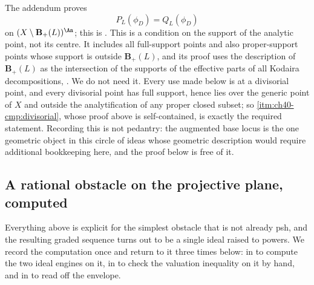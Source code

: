 \begin{remark}
\label{rem:ch40-off-base-locus}
The addendum proves
\[
                       P_L(\phi_D)=Q_L(\phi_D)
\tag{40.8}\label{eq:bj-smooth-off-base}
\]
on $(X\setminus\mathbf B_+(L))^{\An}$; this is
\cite[Lemma~1.5]{BJ22b}.  This is a condition on the support of the
analytic point, not its centre.  It includes all full-support points and
also proper-support points whose support is outside $\mathbf B_+(L)$, and its proof uses the description of
$\mathbf B_+(L)$ as the intersection of the supports of the effective
parts of all Kodaira decompositions, \cite{ELMNP05}.  We do not
need it.  Every use made below is at a divisorial point, and every
divisorial point has full support, hence lies over the generic point of
$X$ and outside the analytification of any proper closed subset; so
\cref{itm:ch40-cmp:divisorial}, whose proof above is self-contained, is
exactly the required statement.  Recording this is not pedantry: the
augmented base locus is the one geometric object in this circle of ideas
whose geometric description would require additional bookkeeping here, and the proof
below is free of it.
\end{remark}

\subsection{A rational obstacle on the projective plane, computed}
\label{sec:ch40-p2-example}

Everything above is explicit for the simplest obstacle that is not already
psh, and the resulting graded sequence turns out to be a single ideal raised
to powers.  We record the computation once and return to it three times
below: in  to compute the two ideal engines on it,
in  to check the valuation inequality on it
by hand, and in  to read off the envelope.

